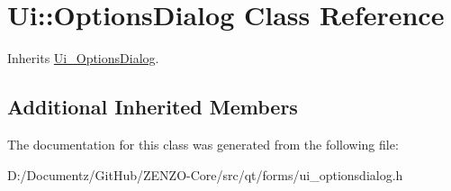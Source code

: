 \hypertarget{class_ui_1_1_options_dialog}{}\section{Ui\+::Options\+Dialog Class Reference}
\label{class_ui_1_1_options_dialog}


Inherits \mbox{\hyperlink{class_ui___options_dialog}{Ui\+\_\+\+Options\+Dialog}}.

\subsection*{Additional Inherited Members}


The documentation for this class was generated from the following file\+:\begin{DoxyCompactItemize}
\item 
D\+:/\+Documentz/\+Git\+Hub/\+Z\+E\+N\+Z\+O-\/\+Core/src/qt/forms/ui\+\_\+optionsdialog.\+h\end{DoxyCompactItemize}
